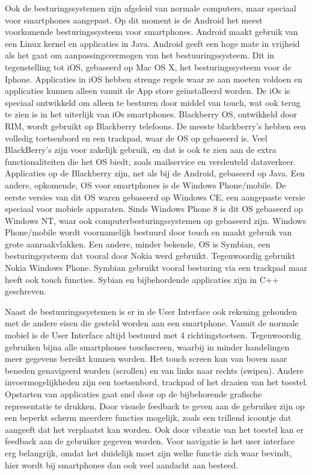 Ook de besturingssystemen zijn afgeleid van normale computers, maar speciaal voor smartphones aangepast. Op dit moment is de Android het meest voorkomende besturingssysteem voor smartphones. Android maakt gebruik van een Linux kernel en applicaties in Java. Android geeft een hoge mate in vrijheid als het gaat om aanpassingsvermogen van het bestuuringssysteem. Dit in tegenstelling tot iOS, gebaseerd op Mac OS X, het besturingssysteem voor de Iphone. Applicaties in iOS hebben strenge regels waar ze aan moeten voldoen en applicaties kunnen alleen vanuit de App store geïnstalleerd worden. De iOs is speciaal ontwikkeld om alleen te besturen door middel van touch, wat ook terug te zien is in het uiterlijk van iOs smartphones. Blackberry OS, ontwikkeld door RIM, wordt gebruikt op Blackberry telefoons. De meeste blackberry’s hebben een volledig toetsenbord en een trackpad, waar de OS op gebaseerd is. Veel BlackBerry’s zijn voor zakelijk gebruik, en dat is ook te zien aan de extra functionaliteiten die het OS biedt, zoals mailservice en versleuteld dataverkeer. Applicaties op de Blackberry zijn, net als bij de Android, gebaseerd op Java. Een andere, opkomende, OS voor smartphones is de Windows Phone/mobile. De eerste versies van dit OS waren gebaseerd op Windows CE, een aangepaste versie speciaal voor mobiele apparaten. Sinds Windows Phone 8 is dit OS gebaseerd op Windows NT, waar ook computerbesturingssystemen op gebaseerd zijn. Windows Phone/mobile wordt voornamelijk bestuurd door touch en maakt gebruik van grote aanraakvlakken. Een andere, minder bekende, OS is Symbian, een besturingsysteem dat vooral door Nokia werd gebruikt. Tegenwoordig gebruikt Nokia Windows Phone. Symbian gebruikt vooral besturing via een trackpad maar heeft ook touch functies. Sybian en bijbehordende applicaties zijn in C++ geschreven.

Naast de bestuuringssyetemen is er in de User Interface ook rekening gehouden met de andere eisen die gesteld worden aan een smartphone. Vanuit de normale mobiel is de User Interface altijd bestuurd met 4 richtingstoetsen. Tegenwoordig gebruiken bijna alle smartphones touchscreen, waarbij in minder handelingen meer gegevens bereikt kunnen worden. Het touch screen kan van boven naar beneden genavigeerd worden (scrollen) en van links naar rechts (swipen). Andere invoermogelijkheden zijn een toetsenbord, trackpad of het draaien van het toestel. Opstarten van applicaties gaat snel door op de bijbehorende grafische representatie te drukken. Door visuele feedback te geven aan de gebruiker zijn op een beperkt scherm meerdere functies mogelijk, zoals een trillend icoontje dat aangeeft dat het verplaatst kan worden. Ook door vibratie van het toestel kan er feedback aan de gebruiker gegeven worden. Voor navigatie is het user interface erg belangrijk, omdat het duidelijk moet zijn welke functie zich waar bevindt, hier wordt bij smartphones dan ook veel aandacht aan besteed. 

